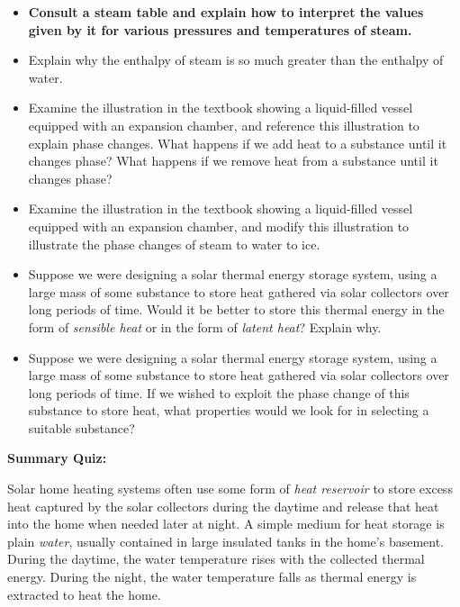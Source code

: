 \begin{itemize}
\item{} {\bf Consult a steam table and explain how to interpret the values given by it for various pressures and temperatures of steam.}
\item{} Explain why the enthalpy of steam is so much greater than the enthalpy of water.
\item{} Examine the illustration in the textbook showing a liquid-filled vessel equipped with an expansion chamber, and reference this illustration to explain phase changes.  What happens if we add heat to a substance until it changes phase?  What happens if we remove heat from a substance until it changes phase?
\item{} Examine the illustration in the textbook showing a liquid-filled vessel equipped with an expansion chamber, and modify this illustration to illustrate the phase changes of steam to water to ice.  
\item{} Suppose we were designing a solar thermal energy storage system, using a large mass of some substance to store heat gathered via solar collectors over long periods of time.  Would it be better to store this thermal energy in the form of {\it sensible heat} or in the form of {\it latent heat}?  Explain why.
\item{} Suppose we were designing a solar thermal energy storage system, using a large mass of some substance to store heat gathered via solar collectors over long periods of time.  If we wished to exploit the phase change of this substance to store heat, what properties would we look for in selecting a suitable substance?
\end{itemize}












\vfil \eject

\noindent
{\bf Summary Quiz:}

Solar home heating systems often use some form of {\it heat reservoir} to store excess heat captured by the solar collectors during the daytime and release that heat into the home when needed later at night.  A simple medium for heat storage is plain {\it water}, usually contained in large insulated tanks in the home's basement.  During the daytime, the water temperature rises with the collected thermal energy.  During the night, the water temperature falls as thermal energy is extracted to heat the home.

